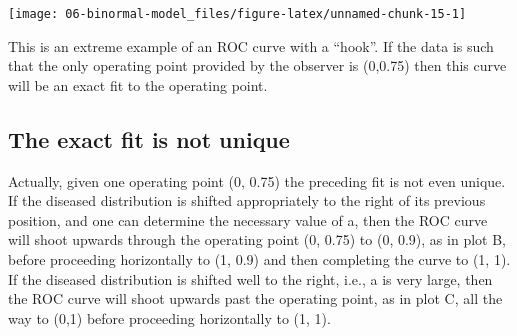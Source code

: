 \documentclass[
]{book}
\begin{document}
\begin{center}\texttt{[image: 06-binormal-model\_files/figure-latex/unnamed-chunk-15-1]} \end{center}

This is an extreme example of an ROC curve with a ``hook''. If the data is such that the only operating point provided by the observer is (0,0.75) then this curve will be an exact fit to the operating point.

\hypertarget{the-exact-fit-is-not-unique}{%
\subsection{The exact fit is not unique}\label{the-exact-fit-is-not-unique}}

Actually, given one operating point (0, 0.75) the preceding fit is not even unique. If the diseased distribution is shifted appropriately to the right of its previous position, and one can determine the necessary value of a, then the ROC curve will shoot upwards through the operating point (0, 0.75) to (0, 0.9), as in plot B, before proceeding horizontally to (1, 0.9) and then completing the curve to (1, 1). If the diseased distribution is shifted well to the right, i.e., a is very large, then the ROC curve will shoot upwards past the operating point, as in plot C, all the way to (0,1) before proceeding horizontally to (1, 1).
\end{document}
